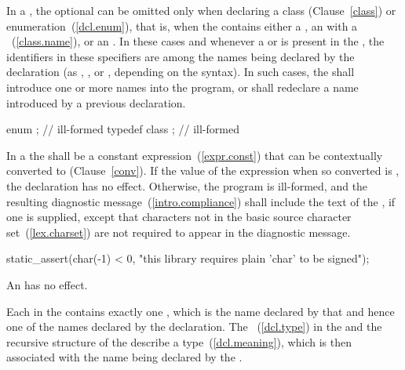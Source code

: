 \pnum
{}%
%
In a , the optional
 can be omitted only when declaring a
class (Clause~\ref{class}) or enumeration~(\ref{dcl.enum}), that is,
when the  contains either a
, an  with
a ~(\ref{class.name}), or an
. In these cases and whenever a
 or  is present in
the , the identifiers in these specifiers
are among the names being declared by the declaration (as
, , or
, depending on the syntax). In such cases,
the  shall introduce one or more names into
the program, or shall redeclare a name introduced by a previous
declaration.
\enterexample

\begin{codeblock}
enum { };           // ill-formed
typedef class { };  //  ill-formed
\end{codeblock}
\exitexample

\pnum
{}%
In a  the
 shall be a constant
expression~(\ref{expr.const}) that can be contextually converted to 
(Clause~\ref{conv}). If the value of the expression when
so converted is , the declaration has no
effect. Otherwise, the program is ill-formed, and the resulting
diagnostic message~(\ref{intro.compliance}) shall include the text of
the , if one is supplied,
except that characters not in the basic
source character set~(\ref{lex.charset}) are not required to appear in
the diagnostic message.
\enterexample

\begin{codeblock}
static_assert(char(-1) < 0, "this library requires plain 'char' to be signed");
\end{codeblock}\exitexample

\pnum
An  has no effect.

\pnum
Each  in the 
contains exactly one , which is the name
declared by that  and hence one of the names
declared by the declaration. The
~(\ref{dcl.type}) in the
 and the recursive 
structure of the  describe a
type~(\ref{dcl.meaning}), which is then associated with the name being
declared by the .


